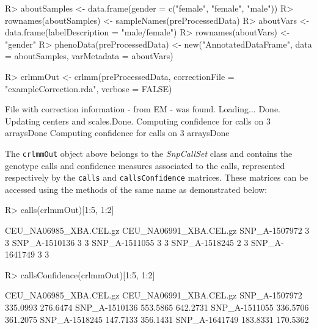 \documentclass{article}
\newcommand{\Robject}[1]{{\texttt{#1}}}
\newcommand{\Rclass}[1]{{\textit{#1}}}
\begin{document}
\begin{Schunk}
\begin{Sinput}
R> aboutSamples <- data.frame(gender = c("female", 
     "female", "male"))
R> rownames(aboutSamples) <- sampleNames(preProcessedData)
R> aboutVars <- data.frame(labelDescription = "male/female")
R> rownames(aboutVars) <- "gender"
R> phenoData(preProcessedData) <- new("AnnotatedDataFrame", 
     data = aboutSamples, varMetadata = aboutVars)
\end{Sinput}
\end{Schunk}

\begin{Schunk}
\begin{Sinput}
R> crlmmOut <- crlmm(preProcessedData, correctionFile = "exampleCorrection.rda", 
     verbose = FALSE)
\end{Sinput}
\begin{Soutput}
File with correction information - from EM - was found.
Loading...
Done.
Updating centers and scales.Done.
Computing confidence for calls on  3  arraysDone
Computing confidence for calls on  3  arraysDone
\end{Soutput}
\end{Schunk}

The \Robject{crlmmOut} object above belongs to the \Rclass{SnpCallSet}
class and contains the genotype calls and confidence measures
associated to the calls, represented respectively by the
\Robject{calls} and \Robject{callsConfidence} matrices. These matrices
can be accessed using the methods of the same name as demonstrated
below:

\begin{Schunk}
\begin{Sinput}
R> calls(crlmmOut)[1:5, 1:2]
\end{Sinput}
\begin{Soutput}
              CEU_NA06985_XBA.CEL.gz CEU_NA06991_XBA.CEL.gz
SNP_A-1507972                      3                      3
SNP_A-1510136                      3                      3
SNP_A-1511055                      3                      3
SNP_A-1518245                      2                      3
SNP_A-1641749                      3                      3
\end{Soutput}
\begin{Sinput}
R> callsConfidence(crlmmOut)[1:5, 1:2]
\end{Sinput}
\begin{Soutput}
              CEU_NA06985_XBA.CEL.gz CEU_NA06991_XBA.CEL.gz
SNP_A-1507972               335.0993               276.6474
SNP_A-1510136               553.5865               642.2731
SNP_A-1511055               336.5706               361.2075
SNP_A-1518245               147.7133               356.1431
SNP_A-1641749               183.8331               170.5362
\end{Soutput}
\end{Schunk}
\end{document}
